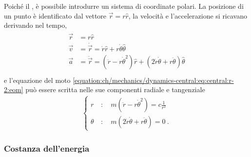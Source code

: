 \documentclass[letterpaper,10pt,italian]{jupyterBook}
\begin{document}
\sphinxAtStartPar
Poiché il {\hyperref[\detokenize{ch/mechanics/dynamics-central:physics-hs-mechanics-dynamics-motion-central-plane}]{}}, è possibile introdurre un sistema di coordinate polari. La posizione di un punto è identificato dal vettore  \(\vec{r} = r \hat{r}\), la velocità e l’accelerazione si ricavano derivando nel tempo,
\begin{equation*}
\begin{split}\begin{aligned}
 \vec{r} & = r \hat{r} \\
 \vec{v} & =  \dot{\vec{r}} = \dot{r} \hat{r} + r \dot{\theta} \hat{\theta} \\
 \vec{a} & = \ddot{\vec{r}} = \left( \ddot{r} - r \dot{\theta}^2 \right) \hat{r} + \left( 2 \dot{r} \dot{\theta} + r \ddot{\theta} \right) \hat{\theta} \\
\end{aligned}\end{split}
\end{equation*}
\sphinxAtStartPar
e l’equazione del moto \eqref{equation:ch/mechanics/dynamics-central:eq:central:r-2:eom} può essere scritta nelle sue componenti radiale e tangenziale
\begin{equation}\label{equation:ch/mechanics/dynamics-central:eq:central:r-2:eom:coords}
\begin{split}\begin{cases}
 r      \ & : \quad m \left( \ddot{r} - r \dot{\theta}^2 \right) = c \frac{1}{r^2} \\
 \theta \ & : \quad m \left( 2 \dot{r} \dot{\theta} + r \ddot{\theta} \right) = 0 \ .
\end{cases}\end{split}
\end{equation}\label{\detokenize{ch/mechanics/dynamics-central:physics-hs-mechanics-dynamics-motion-central-energy}}\subsubsection*{Costanza dell’energia}
\end{document}
